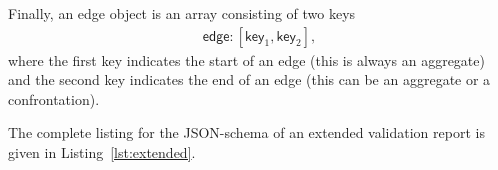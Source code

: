 \documentclass[a4paper, 11pt,titlepage]{article}
\begin{document}
Finally, an edge object is an array consisting of two keys
\begin{align}
\textsf{edge} : [\textsf{key}_1,\textsf{key}_2],
\end{align}
where the first key indicates the start of an edge (this is always an aggregate)
and the second key indicates the end of an edge (this can be an aggregate or a
confrontation). 

The complete listing for the JSON-schema of an extended validation
report is given in Listing~\ref{lst:extended}. 
%

%






\clearpage{}

\end{document}
